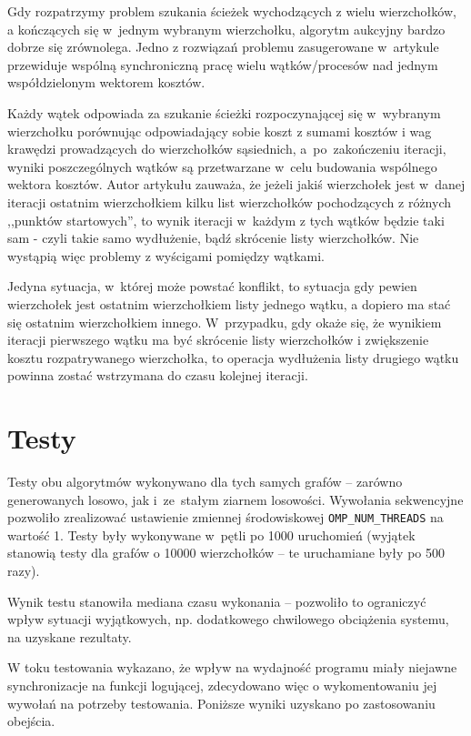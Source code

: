 \documentclass {report}
\begin{document}
Gdy rozpatrzymy problem szukania ścieżek wychodzących z wielu wierzchołków, a kończących się w~jednym wybranym wierzchołku, algorytm aukcyjny bardzo dobrze się zrównolega. Jedno z rozwiązań problemu zasugerowane w~artykule \cite{Bertsekas1991} przewiduje wspólną synchroniczną pracę wielu wątków/procesów nad jednym współdzielonym wektorem kosztów.

Każdy wątek odpowiada za szukanie ścieżki rozpoczynającej się w~wybranym wierzchołku porównując odpowiadający sobie koszt z sumami kosztów i wag krawędzi prowadzących do wierzchołków sąsiednich, a~po~zakończeniu iteracji, wyniki poszczególnych wątków są przetwarzane w~celu budowania wspólnego wektora kosztów. Autor artykułu zauważa, że jeżeli jakiś wierzchołek jest w~danej iteracji ostatnim wierzchołkiem kilku list wierzchołków pochodzących z różnych ,,punktów startowych'', to wynik iteracji w~każdym z tych wątków będzie taki sam - czyli takie samo wydłużenie, bądź skrócenie listy wierzchołków. Nie wystąpią więc problemy z wyścigami pomiędzy wątkami.

Jedyna sytuacja, w~której może powstać konflikt, to sytuacja gdy pewien wierzchołek jest ostatnim wierzchołkiem listy jednego wątku, a dopiero ma stać się ostatnim wierzchołkiem innego. W~przypadku, gdy okaże się, że wynikiem iteracji pierwszego wątku ma być skrócenie listy wierzchołków i zwiększenie kosztu rozpatrywanego wierzchołka, to operacja wydłużenia listy drugiego wątku powinna zostać wstrzymana do czasu kolejnej iteracji.

\section{Testy}

Testy obu algorytmów wykonywano dla tych samych grafów -- zarówno generowanych losowo, jak i~ze~stałym ziarnem losowości. Wywołania sekwencyjne pozwoliło zrealizować ustawienie zmiennej środowiskowej \verb|OMP_NUM_THREADS| na wartość 1. Testy były wykonywane w~pętli po 1000 uruchomień (wyjątek stanowią testy dla grafów o 10000 wierzchołków -- te uruchamiane były po 500 razy).

Wynik testu stanowiła mediana czasu wykonania -- pozwoliło to ograniczyć wpływ sytuacji wyjątkowych, np. dodatkowego chwilowego obciążenia systemu, na uzyskane rezultaty.

W toku testowania wykazano, że wpływ na wydajność programu miały niejawne synchronizacje na funkcji logującej, zdecydowano więc o wykomentowaniu jej wywołań na potrzeby testowania. Poniższe wyniki uzyskano po zastosowaniu obejścia.
\end{document}
